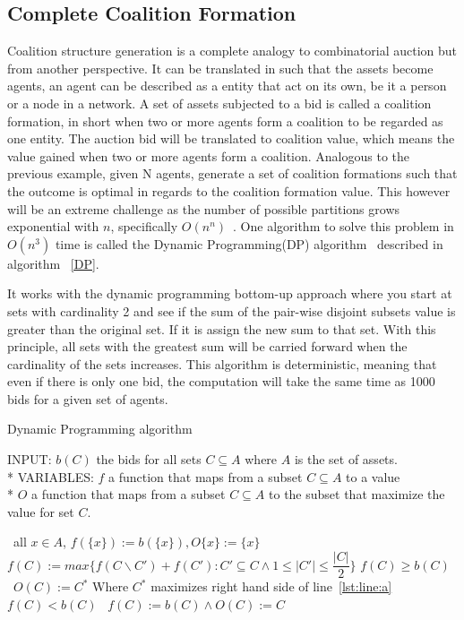 \documentclass[a4paper, 12pt]{report}
\begin{document}
\subsection{Complete Coalition Formation}
Coalition structure generation is a complete analogy to combinatorial auction but from another perspective.
It can be translated in such that the assets become agents, 
an agent can be described as a entity that act on its own, be it a person or a node in a network.
A set of assets subjected to a bid is called a coalition formation, 
in short when two or more agents form a coalition to be regarded as one entity.
The auction bid will be translated to coalition value, 
which means the value gained when two or more agents form a coalition.
Analogous to the previous example, given N agents, 
generate a set of coalition formations such that the outcome is optimal in regards to the coalition formation value.
This however will be an extreme challenge as the number of possible partitions grows exponential with $n$, specifically $O(n^n)$~\cite{rahwan2008improved}.
One algorithm to solve this problem in $O(n^3)$ time is called the Dynamic Programming(DP) algorithm~\citep{rothkopf1998computationally} described in algorithm ~\ref{DP}.

It works with the dynamic programming bottom-up approach where you start at sets with cardinality 2 and see if the sum of the pair-wise disjoint subsets value is greater than the original set.
If it is assign the new sum to that set.
With this principle, 
all sets with the greatest sum will be carried forward when the cardinality of the sets increases.
This algorithm is deterministic, 
meaning that even if there is only one bid, the computation will take the same time as 1000 bids for a given set of agents. \\

\begin{algorithm}
\caption{Dynamic Programming algorithm \label{DP}}
INPUT: $b(C)$ the bids for all sets $C \subseteq A$ where $A$ is the set of assets.\\*
VARIABLES: $f$ a function that maps from a subset $C \subseteq A$ to a value\\*
$O$ a function that maps from a subset $C \subseteq A$ to the subset that maximize the value for set $C$.
\begin{algorithmic}[1]
\STATE\algorithmicfor\ all $x \in A$, \algorithmicdo $f(\{x\}):= b(\{x\}),O\{x\}:= \{x\}$ \algorithmicendfor
{}
\STATE $f(C) := max\{f(C\backslash C')+f(C'):C'\subseteq C \wedge 1 \leq \vert C' \vert \leq \dfrac{\vert C \vert}{2}\}$ \label{lst:line:a}
\STATE\algorithmicif $f(C) \geq b(C)$ \algorithmicthen\ $O(C) := C^{*}$ \hfill Where $C^{*}$ maximizes right hand side of line~\ref{lst:line:a} \algorithmicendif
\STATE\algorithmicif $f(C) < b(C)$ \algorithmicthen\ $f(C) := b(C)\wedge O(C) := C$ \algorithmicendif
\ENDFOR
\ENDFOR
\end{algorithmic}
\end{algorithm}
\end{document}
